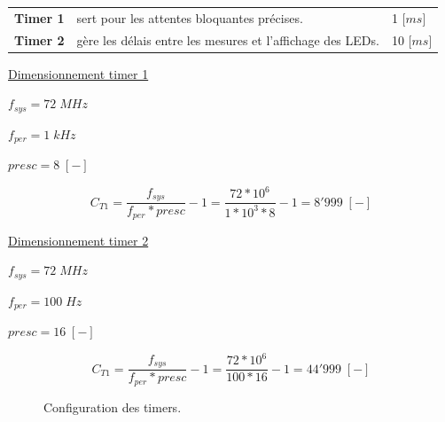 \begin{table}[h]
\begin{tabular}{lll}
	\textbf{Timer 1} & sert pour les attentes bloquantes précises. & 1 [$ms$] \\
	\textbf{Timer 2} & gère les délais entre les mesures et l'affichage des LEDs. & 10 [$ms$] \\
\end{tabular} 
\end{table} \vspace*{-5pt}

\underline{Dimensionnement timer 1}

$f_{sys} = 72\;MHz$

$f_{per} = 1\;kHz$

$presc = 8\;[-]$ \vspace*{-5pt}

\begin{equation*}
	C_{T1} = \frac{f_{sys}}{f_{per}*presc} - 1 = \frac{72*10^{6}}{1*10^{3}*8} - 1 = 8'999\; [-]
\end{equation*}


\underline{Dimensionnement timer 2}

$f_{sys} = 72\;MHz$

$f_{per} = 100\;Hz$

$presc = 16\;[-]$ \vspace*{-5pt}

\begin{equation}
	C_{T1} = \frac{f_{sys}}{f_{per}*presc} - 1 = \frac{72*10^{6}}{100*16} - 1 = 44'999\; [-]
\end{equation}

\begin{figure}[h]
	\centering
	\caption{Configuration des timers.}
	\label{fig:timers}
\end{figure}

